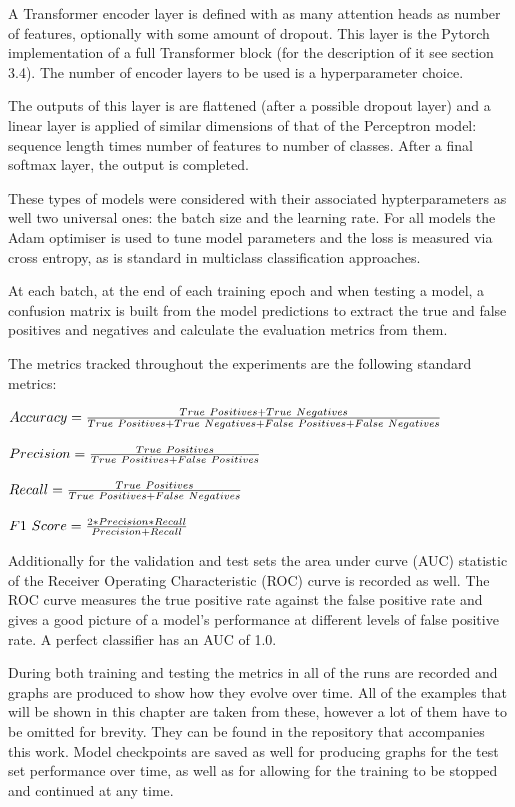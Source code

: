 \documentclass[bsc,frontabs,singlespacing,parskip,deptreport]{infthesis}
\begin{document}
A Transformer encoder layer is defined with as many attention heads as number of features, optionally with some amount of dropout. This layer is the Pytorch implementation of a full Transformer block (for the description of it see section 3.4). The number of encoder layers to be used is a hyperparameter choice.

The outputs of this layer is are flattened (after a possible dropout layer) and a linear layer is applied of similar dimensions of that of the Perceptron model: sequence length times number of features to number of classes. After a final softmax layer, the output is completed.

These types of models were considered with their associated hypterparameters as well two universal ones: the batch size and the learning rate. For all models the Adam optimiser is used \cite{adam} to tune model parameters and the loss is measured via cross entropy, as is standard in multiclass classification approaches.

At each batch, at the end of each training epoch and when testing a model, a confusion matrix is built from the model predictions to extract the true and false positives and negatives and calculate the evaluation metrics from them. 

The metrics tracked throughout the experiments are the following standard metrics:

\begin{center}
$ Accuracy = {True~Positives + True~Negatives \over True~Positives + True~Negatives + False~Positives + False~Negatives}   $

$ Precision = {True~Positives \over True~Positives + False~Positives}   $

$ Recall = {True~Positives \over True~Positives + False~Negatives}   $

$ F1~Score = {2*Precision*Recall \over Precision + Recall}   $
\end{center}

Additionally for the validation and test sets the area under curve (AUC) statistic of the Receiver Operating Characteristic (ROC) curve is recorded as well. The ROC curve measures the true positive rate against the false positive rate and gives a good picture of a model's performance at different levels of false positive rate. A perfect classifier has an AUC of 1.0.

During both training and testing the metrics in all of the runs are recorded and graphs are produced to show how they evolve over time. All of the examples that will be shown in this chapter are taken from these, however a lot of them have to be omitted for brevity. They can be found in the repository that accompanies this work. Model checkpoints are saved as well for producing graphs for the test set performance over time, as well as for allowing for the training to be stopped and continued at any time.
\end{document}

